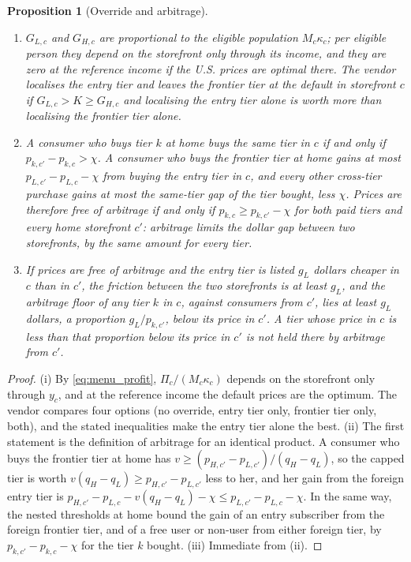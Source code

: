 \documentclass[11pt]{article}
\newtheorem{aproposition}{Proposition}[section]
\theoremstyle{definition}
\theoremstyle{remark}
\begin{document}
\begin{aproposition}[Override and arbitrage]\label{prop:constraints}
\begin{enumerate}[label=(\roman*),leftmargin=*]
\item $G_{L,c}$ and $G_{H,c}$ are proportional to the eligible population $M_c\kappa_c$; per eligible person they depend on the storefront only through its income, and they are zero at the reference income if the U.S. prices are optimal there. The vendor localises the entry tier and leaves the frontier tier at the default in storefront $c$ if $G_{L,c}>K\ge G_{H,c}$ and localising the entry tier alone is worth more than localising the frontier tier alone.
\item A consumer who buys tier $k$ at home buys the same tier in $c$ if and only if $p_{k,c'}-p_{k,c}>\chi$. A consumer who buys the frontier tier at home gains at most $p_{L,c'}-p_{L,c}-\chi$ from buying the entry tier in $c$, and every other cross-tier purchase gains at most the same-tier gap of the tier bought, less $\chi$. Prices are therefore free of arbitrage if and only if $p_{k,c}\ge p_{k,c'}-\chi$ for both paid tiers and every home storefront $c'$: arbitrage limits the dollar gap between two storefronts, by the same amount for every tier.
\item If prices are free of arbitrage and the entry tier is listed $g_L$ dollars cheaper in $c$ than in $c'$, the friction between the two storefronts is at least $g_L$, and the arbitrage floor of any tier $k$ in $c$, against consumers from $c'$, lies at least $g_L$ dollars, a proportion $g_L/p_{k,c'}$, below its price in $c'$. A tier whose price in $c$ is less than that proportion below its price in $c'$ is not held there by arbitrage from $c'$.
\end{enumerate}
\end{aproposition}

\begin{proof}
(i) By \eqref{eq:menu_profit}, $\Pi_c/(M_c\kappa_c)$ depends on the storefront only through $y_c$, and at the reference income the default prices are the optimum. The vendor compares four options (no override, entry tier only, frontier tier only, both), and the stated inequalities make the entry tier alone the best. (ii) The first statement is the definition of arbitrage for an identical product. A consumer who buys the frontier tier at home has $v\ge(p_{H,c'}-p_{L,c'})/(q_H-q_L)$, so the capped tier is worth $v(q_H-q_L)\ge p_{H,c'}-p_{L,c'}$ less to her, and her gain from the foreign entry tier is $p_{H,c'}-p_{L,c}-v(q_H-q_L)-\chi\le p_{L,c'}-p_{L,c}-\chi$. In the same way, the nested thresholds at home bound the gain of an entry subscriber from the foreign frontier tier, and of a free user or non-user from either foreign tier, by $p_{k,c'}-p_{k,c}-\chi$ for the tier $k$ bought. (iii) Immediate from (ii).
\end{proof}
\end{document}
